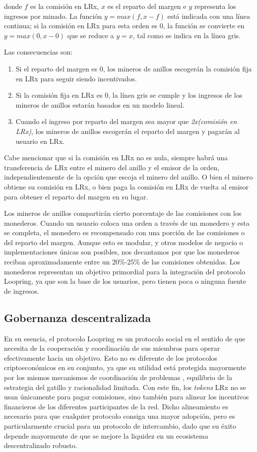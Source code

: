\documentclass[UTF8,nofonts]{article}
\begin{document}
\begin{multicols}{2}
donde $f$ es la comisión en LRx, $x$ es el reparto del margen e $y$ representa los ingresos por minado. La función $y=max(f, x-f)$ está indicada con una línea continua; si la comisión en LRx para esta orden es $0$, la función se convierte en $y=max(0, x - 0)$ que se reduce a $y=x$, tal como se indica en la línea gris.

Las consecuencias son:  
\begin{enumerate}
	\item Si el reparto del margen es 0, los mineros de anillos escogerán la comisión fija en LRx para seguir siendo incentivados. 
	\item Si la comisión fija en LRx es 0, la línea gris se cumple y los ingresos de los mineros de anillos estarán basados en un modelo lineal.
	\item Cuando el ingreso por reparto del margen sea mayor que  \textit{2x(comisión en LRx)}, los mineros de anillos escogerán el reparto del margen y pagarán al usuario en LRx.
\end{enumerate}

Cabe mencionar que si la comisión en LRx no es nula, siempre habrá una transferencia de LRx entre el minero del anillo y el emisor de la orden, independientemente de la opción que escoja el minero del anillo. O bien el minero obtiene su comisión en LRx, o bien paga la comisión en LRx de vuelta al emisor para obtener el reparto del margen en su lugar.

Los mineros de anillos compartirán cierto porcentaje de las comisiones con los monederos. Cuando un usuario coloca una orden a través de un monedero y esta se completa, el monedero es recompensado con una porción de las comisiones o del reparto del margen. Aunque esto es modular, y otros modelos de negocio o implementaciones únicas son posibles, nos decantamos por que los monederos reciban aproximadamente entre un 20\%-25\% de las comisiones obtenidas. Los monederos representan un objetivo primordial para la integración del protocolo Loopring, ya que son la base de los usuarios, pero tienen poca o ninguna fuente de ingresos.

\subsection{Gobernanza descentralizada}
En su esencia, el protocolo Loopring es un protocolo social en el sentido de que necesita de la cooperación y coordinación de sus miembros para operar efectivamente hacia un objetivo. Esto no es diferente de los protocolos criptoeconómicos en su conjunto, ya que su utilidad está protegida mayormente por los mismos mecanismos de coordinación de problemas \cite{vitalikgovernance}, equilibrio de la estrategia del gatillo y racionalidad limitada. Con este fin, los \textit{tokens} LRx no se usan únicamente para pagar comisiones, sino también para alinear los incentivos financieros de los diferentes participantes de la red. Dicho alineamiento es necesario para que cualquier protocolo consiga una mayor adopción, pero es particularmente crucial para un protocolo de intercambio, dado que su éxito depende mayormente de que se mejore la liquidez en un ecosistema descentralizado robusto.


\end{multicols}
\end{document}

